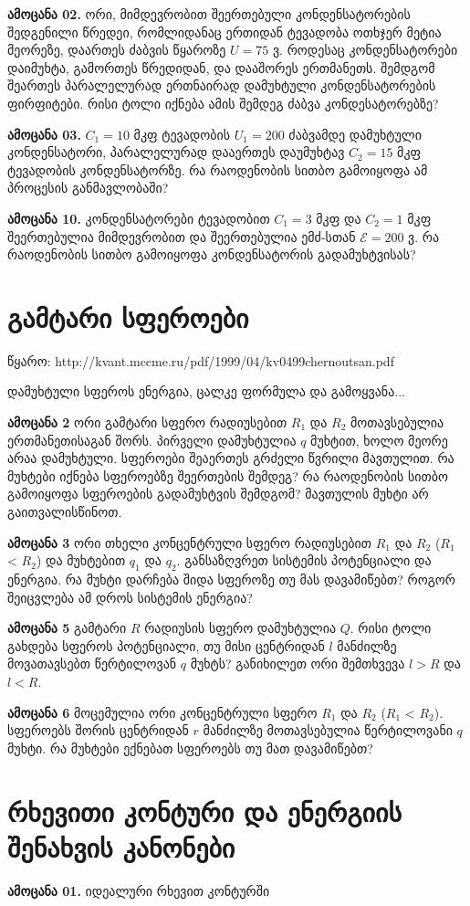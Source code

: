 \documentclass[a4paper]{book}
\begin{document}
\textbf{ამოცანა 02.} ორი, მიმდევრობით შეერთებული კონდენსატორების შედგენილი წრედეი, რომლიდანაც ერთიდან ტევადობა ოთხჯერ მეტია მეორეზე, დაართეს ძაბვის წყაროზე $U = 75$ ვ. როდესაც კონდენსატორები დაიმუხტა, გამორთეს წრედიდან, და დააშორეს ერთმანეთს. შემდგომ შეართეს პარალელურად ერთნაირად დამუხტული კონდენსატორების ფირფიტები. რისი ტოლი იქნება ამის შემდეგ ძაბვა კონდესატორებზე?

\textbf{ამოცანა 03.} $C_1 = 10$ მკფ ტევადობის $U_1=200$ ძაბვამდე დამუხტული კონდენსატორი, პარალელურად დააერთეს დაუმუხტავ $C_2 = 15$ მკფ ტევადობის კონდენსატორზე. რა რაოდენობის სითბო გამოიყოფა ამ პროცესის განმავლობაში?

\textbf{ამოცანა 10.} კონდენსატორები ტევადობით $C_1=3$ მკფ და $C_2=1$ მკფ შეერთებულია მიმდევრობით და შეერთებულია ემძ-სთან $\mathcal{E} = 200$ ვ. რა რაოდენობის სითბო გამოიყოფა კონდენსატორის გადამუხტვისას?

\section{გამტარი სფეროები}
წყარო: http://kvant.mccme.ru/pdf/1999/04/kv0499chernoutsan.pdf


დამუხტული სფეროს ენერგია, ცალკე ფორმულა და გამოყვანა...

\textbf{ამოცანა 2} ორი გამტარი სფერო რადიუსებით $R_1$ და $R_2$ მოთავსებულია ერთმანეთისაგან შორს. პირველი დამუხტულია $q$ მუხტით, ხოლო მეორე არაა დამუხტული. სფეროები შეაერთეს გრძელი წვრილი მავთულით. რა მუხტები იქნება სფეროებზე შეერთების შემდეგ? რა რაოდენობის სითბო გამოიყოფა სფეროების გადამუხტვის შემდგომ? მავთულის მუხტი არ გაითვალისწინოთ.

\textbf{ამოცანა 3} ორი თხელი კონცენტრული სფერო რადიუსებით $R_1$ და $R_2$ ($R_1$ < $R_2$) და მუხტებით $q_1$ და $q_2$. განსაზღვრეთ სისტემის პოტენციალი და ენერგია. რა მუხტი დარჩება შიდა სფეროზე თუ მას დავამიწებთ? როგორ შეიცვლება ამ დროს სისტემის ენერგია?

\textbf{ამოცანა 5} გამტარი $R$ რადიუსის სფერო დამუხტულია $Q$. რისი ტოლი გახდება სფეროს პოტენციალი, თუ მისი ცენტრიდან $l$ მანძილზე მოვათავსებთ წერტილოვან $q$ მუხტს? განიხილეთ ორი შემთხვევა $l > R$ და $l < R$.

\textbf{ამოცანა 6} მოცემულია ორი კონცენტრული სფერო $R_1$ და $R_2$ ($R_1$ < $R_2$). სფეროებს შორის ცენტრიდან $r$ მანძილზე მოთავსებულია წერტილოვანი $q$ მუხტი. რა მუხტები ექნებათ სფეროებს თუ მათ დავამიწებთ?

\section{რხევითი კონტური და ენერგიის შენახვის კანონები}
\textbf{ამოცანა 01.} იდეალური რხევით კონტურში 
\end{document}
